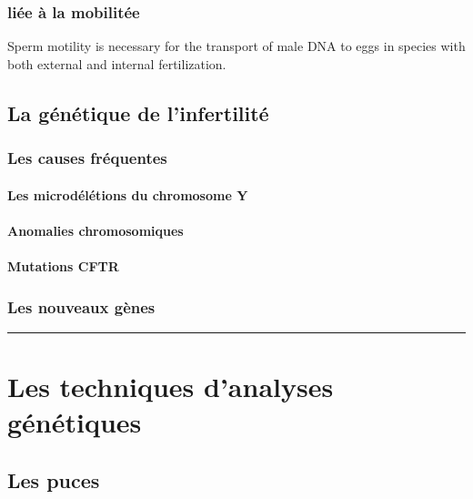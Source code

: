 \documentclass[12pt,twoside]{reedthesis}
\theoremstyle{definition}
\theoremstyle{definition}
\theoremstyle{remark}
\begin{document}
  \subsubsection{liée à la mobilitée}\label{liee-a-la-mobilitee}
  
  Sperm motility is necessary for the transport of male DNA to eggs in
  species with both external and internal fertilization.
  
  \subsection{La génétique de
  l'infertilité}\label{la-genetique-de-linfertilite}
  
  \subsubsection{Les causes fréquentes}\label{les-causes-frequentes}
  
  \paragraph{Les microdélétions du chromosome
  Y}\label{les-microdeletions-du-chromosome-y}
  
  \paragraph{Anomalies chromosomiques}\label{anomalies-chromosomiques}
  
  \paragraph{Mutations CFTR}\label{mutations-cftr}
  
  \subsubsection{Les nouveaux gènes}\label{les-nouveaux-genes}
  
  \begin{center}\rule{0.5\linewidth}{\linethickness}\end{center}
  
  \section{Les techniques d'analyses
  génétiques}\label{les-techniques-danalyses-genetiques}
  
  \subsection{Les puces}\label{les-puces}
  
\end{document}
